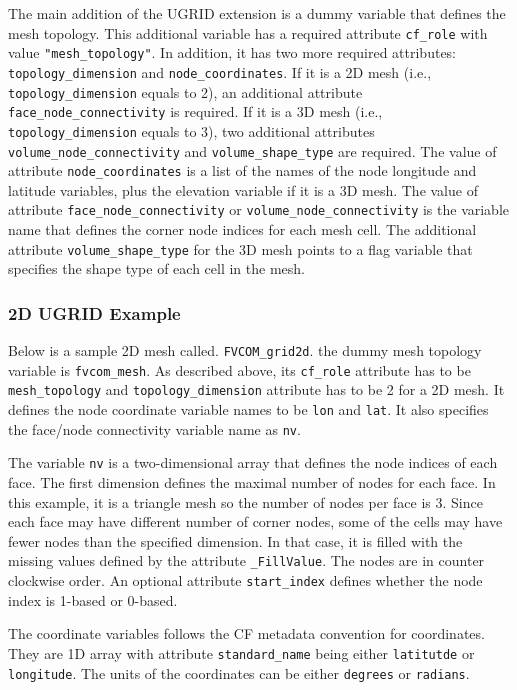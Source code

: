 The main addition of the UGRID extension is a dummy variable that defines the mesh
topology.  This additional variable has a required attribute {\tt cf\_role} with value {\tt "mesh\_topology"}.  In addition, it has two more required attributes: {\tt topology\_dimension}
and {\tt node\_coordinates}.  If it is a 2D mesh (i.e., {\tt topology\_dimension} equals to 2), an additional attribute
{\tt face\_node\_connectivity} is required.  If it is a 3D mesh (i.e., {\tt topology\_dimension} equals to 3), two additional attributes {\tt volume\_node\_connectivity} and {\tt volume\_shape\_type} are required.
The value of attribute {\tt node\_coordinates} is a list of the names of the node longitude and latitude variables,
plus the elevation variable if it is a 3D mesh.
The value of attribute {\tt face\_node\_connectivity} or {\tt volume\_node\_connectivity} is the variable name that defines the corner node indices for each mesh cell. The additional attribute {\tt volume\_shape\_type} for the
3D mesh points to a flag variable that specifies the shape type of each cell in the mesh.

\subsubsection{2D UGRID Example}

Below is a sample 2D mesh called. {\tt FVCOM\_grid2d}. the dummy mesh topology variable is {\tt fvcom\_mesh}.  As described above, its {\tt cf\_role} attribute has to be {\tt mesh\_topology}
and {\tt topology\_dimension} attribute has to be 2 for a 2D mesh.  It defines
the node coordinate variable names to be {\tt lon} and {\tt lat}.  It also specifies the face/node connectivity variable name as {\tt nv}.

The variable {\tt nv} is a two-dimensional array that defines the node indices of each face. The first dimension
defines the maximal number of nodes for each face. In this example, it is a
triangle mesh so the number of nodes per face is 3.  Since each face may have different number of corner nodes,
some of the cells may have fewer nodes than the specified dimension. In that case, it is filled with the
missing values defined by the attribute {\tt \_FillValue}.  The nodes are in counter clockwise order.  An optional attribute
{\tt start\_index} defines whether the node index is 1-based or 0-based.

The coordinate variables follows the CF metadata convention for coordinates.  They are 1D array with attribute
{\tt standard\_name} being either {\tt latitutde} or {\tt longitude}.  The units of the coordinates can be either {\tt degrees} or {\tt radians}.

